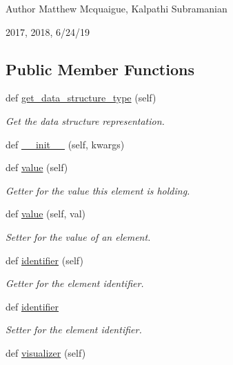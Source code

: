 \begin{DoxyAuthor}{Author}
Matthew Mcquaigue, Kalpathi Subramanian
\end{DoxyAuthor}
2017, 2018, 6/24/19 \subsection*{Public Member Functions}
\begin{DoxyCompactItemize}
\item 
def \hyperlink{classbridges_1_1element_1_1_element_a87b8c79123d20eb2af48ae4e4f1bcf32}{get\+\_\+data\+\_\+structure\+\_\+type} (self)
\begin{DoxyCompactList}\small\item\em Get the data structure representation. \end{DoxyCompactList}\item 
def \hyperlink{classbridges_1_1element_1_1_element_ac0291307e216e5f2da60a340a1e2142d}{\+\_\+\+\_\+init\+\_\+\+\_\+} (self, kwargs)
\item 
def \hyperlink{classbridges_1_1element_1_1_element_ab89d51b751ad0956d7ec855c35335ad2}{value} (self)
\begin{DoxyCompactList}\small\item\em Getter for the value this element is holding. \end{DoxyCompactList}\item 
def \hyperlink{classbridges_1_1element_1_1_element_a810c122a8b900f476601d565291bdbf8}{value} (self, val)
\begin{DoxyCompactList}\small\item\em Setter for the value of an element. \end{DoxyCompactList}\item 
def \hyperlink{classbridges_1_1element_1_1_element_a8eb98e53169fc83f6adde36e1896cf2f}{identifier} (self)
\begin{DoxyCompactList}\small\item\em Getter for the element identifier. \end{DoxyCompactList}\item 
def \hyperlink{classbridges_1_1element_1_1_element_a70ac403466ed78146974a22cebfa0c19}{identifier}
\begin{DoxyCompactList}\small\item\em Setter for the element identifier. \end{DoxyCompactList}\item 
def \hyperlink{classbridges_1_1element_1_1_element_a727ec3cb97aeb68fec4cb456535f6763}{visualizer} (self)

\end{DoxyCompactItemize}
